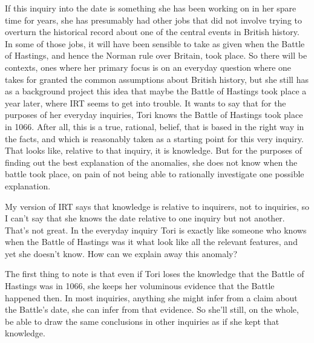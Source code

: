 \documentclass[
  10pt,
  letterpaper,
  twoside]{scrbook}
\begin{document}
If this inquiry into the date is something she has been working on in
her spare time for years, she has presumably had other jobs that did not
involve trying to overturn the historical record about one of the
central events in British history. In some of those jobs, it will have
been sensible to take as given when the Battle of Hastings, and hence
the Norman rule over Britain, took place. So there will be contexts,
ones where her primary focus is on an everyday question where one takes
for granted the common assumptions about British history, but she still
has as a background project this idea that maybe the Battle of Hastings
took place a year later, where IRT seems to get into trouble. It wants
to say that for the purposes of her everyday inquiries, Tori knows the
Battle of Hastings took place in 1066. After all, this is a true,
rational, belief, that is based in the right way in the facts, and which
is reasonably taken as a starting point for this very inquiry. That
looks like, relative to that inquiry, it is knowledge. But for the
purposes of finding out the best explanation of the anomalies, she does
not know when the battle took place, on pain of not being able to
rationally investigate one possible explanation.

My version of IRT says that knowledge is relative to inquirers, not to
inquiries, so I can't say that she knows the date relative to one
inquiry but not another. That's not great. In the everyday inquiry Tori
is exactly like someone who knows when the Battle of Hastings was it
what look like all the relevant features, and yet she doesn't know. How
can we explain away this anomaly?

The first thing to note is that even if Tori loses the knowledge that
the Battle of Hastings was in 1066, she keeps her voluminous evidence
that the Battle happened then. In most inquiries, anything she might
infer from a claim about the Battle's date, she can infer from that
evidence. So she'll still, on the whole, be able to draw the same
conclusions in other inquiries as if she kept that knowledge.
\end{document}
